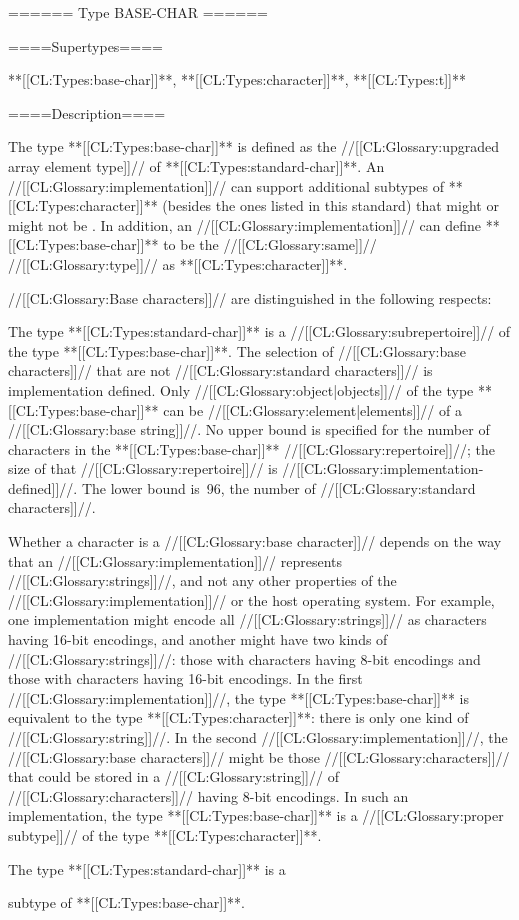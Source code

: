 ====== Type BASE-CHAR ======

====Supertypes====

**[[CL:Types:base-char]]**, **[[CL:Types:character]]**, **[[CL:Types:t]]**

====Description====

The type **[[CL:Types:base-char]]** is defined as the //[[CL:Glossary:upgraded array element type]]// of **[[CL:Types:standard-char]]**. An //[[CL:Glossary:implementation]]// can support additional subtypes of **[[CL:Types:character]]** (besides the ones listed in this standard) that might or might not be . In addition, an //[[CL:Glossary:implementation]]// can define **[[CL:Types:base-char]]** to be the //[[CL:Glossary:same]]// //[[CL:Glossary:type]]// as **[[CL:Types:character]]**.

//[[CL:Glossary:Base characters]]// are distinguished in the following respects:

 The type **[[CL:Types:standard-char]]** is a //[[CL:Glossary:subrepertoire]]// of the type **[[CL:Types:base-char]]**.  The selection of //[[CL:Glossary:base characters]]// that are not //[[CL:Glossary:standard characters]]// is implementation defined.  Only //[[CL:Glossary:object|objects]]// of the type **[[CL:Types:base-char]]** can be //[[CL:Glossary:element|elements]]// of a //[[CL:Glossary:base string]]//.  No upper bound is specified for the number of characters in the **[[CL:Types:base-char]]** //[[CL:Glossary:repertoire]]//; the size of that //[[CL:Glossary:repertoire]]// is //[[CL:Glossary:implementation-defined]]//. The lower bound is~96, the number of //[[CL:Glossary:standard characters]]//.





Whether a character is a //[[CL:Glossary:base character]]// depends on the way that an //[[CL:Glossary:implementation]]// represents //[[CL:Glossary:strings]]//, and not any other properties of the //[[CL:Glossary:implementation]]// or the host operating system. For example, one implementation might encode all //[[CL:Glossary:strings]]// as characters having 16-bit encodings, and another might have two kinds of //[[CL:Glossary:strings]]//: those with characters having 8-bit encodings and those with characters having 16-bit encodings. In the first //[[CL:Glossary:implementation]]//, the type **[[CL:Types:base-char]]** is equivalent to the type **[[CL:Types:character]]**: there is only one kind of //[[CL:Glossary:string]]//. In the second //[[CL:Glossary:implementation]]//, the //[[CL:Glossary:base characters]]// might be those //[[CL:Glossary:characters]]// that could be stored in a //[[CL:Glossary:string]]// of //[[CL:Glossary:characters]]// having 8-bit encodings. In such an implementation, the type **[[CL:Types:base-char]]** is a //[[CL:Glossary:proper subtype]]// of the type **[[CL:Types:character]]**.



The type **[[CL:Types:standard-char]]** is a

subtype of **[[CL:Types:base-char]]**.

 
